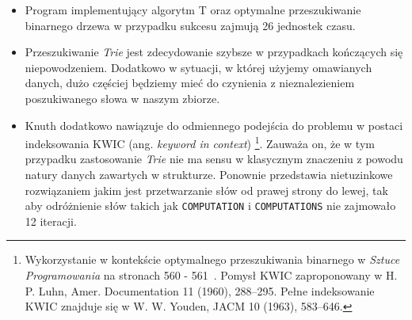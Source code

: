 	\begin{itemize}
		\item Program implementujący algorytm T oraz optymalne przeszukiwanie binarnego drzewa w przypadku sukcesu zajmują 26 jednostek czasu.
		\item Przeszukiwanie \emph{Trie} jest zdecydowanie szybsze w przypadkach kończących się niepowodzeniem. Dodatkowo w sytuacji, w której użyjemy omawianych danych, dużo częściej będziemy mieć do czynienia z nieznalezieniem poszukiwanego słowa w naszym zbiorze.
		\item Knuth dodatkowo nawiązuje do odmiennego podejścia do problemu w postaci indeksowania KWIC (ang. \emph{keyword in context})%
		\footnote{Wykorzystanie w kontekście optymalnego przeszukiwania binarnego w \emph{Sztuce Programowania} na stronach 560 - 561~\cite{KnuthsTheArtOfComputerProgramming3}. Pomysł KWIC zaproponowany w 
			H. P. Luhn, Amer. Documentation 11 (1960), 288–295. Pełne indeksowanie KWIC znajduje się w W. W. Youden, JACM 10 (1963), 583–646. 
		}.
		Zauważa on, że w tym przypadku zastosowanie \emph{Trie} nie ma sensu w klasycznym znaczeniu z powodu natury danych zawartych w strukturze. Ponownie przedstawia nietuzinkowe rozwiązaniem jakim jest przetwarzanie słów od prawej strony do lewej, tak aby odróżnienie słów takich jak \texttt{COMPUTATION} i \texttt{COMPUTATIONS} nie zajmowało 12 iteracji.
	\end{itemize}
	
